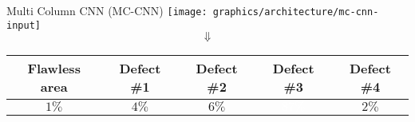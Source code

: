 \begin{frame}{Multi Column CNN (MC-CNN)}
    \texttt{[image: graphics/architecture/mc-cnn-input]}
    $$\Downarrow$$
    \centering
    \begin{tabular}{|c|c|c|c|c|}
        \hline
        Flawless area & Defect \#1 & Defect \#2 & Defect \#3 & Defect \#4\\\hline
        $1\%$ & $4\%$ & $6\%$ & \cellcolor{UniBlue}\textcolor{white}{$87\%$} & $2\%$ \\
        \hline
    \end{tabular}
\end{frame}




